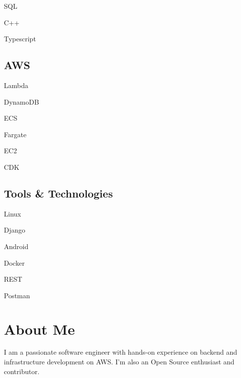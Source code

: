 \documentclass[]{resume}
\begin{document}
\begin{minipage}[t]{0.25\textwidth}
\begin{itemize*}
 \item SQL
 \item C++
 \item Typescript
\end{itemize*}
\subsectionsep

\subsection{AWS}
\begin{itemize*}
 \item Lambda
 \item DynamoDB
 \item ECS
 \item Fargate
 \item EC2
 \item CDK
\end{itemize*}
\subsectionsep

\subsection{Tools \& Technologies}
\begin{itemize*}
 \item Linux
 \item Django
 \item Android
 \item Docker
 \item REST
 \item Postman
\end{itemize*}
\secondarysectionsep

\section{About Me}
\noindent \RaggedRight \normalfont
I am a passionate software engineer with hands-on experience on backend and
infrastructure development on AWS. I'm also an Open Source enthusiast and
contributor.

%
%

\end{minipage}
\hfill
\end{document}
